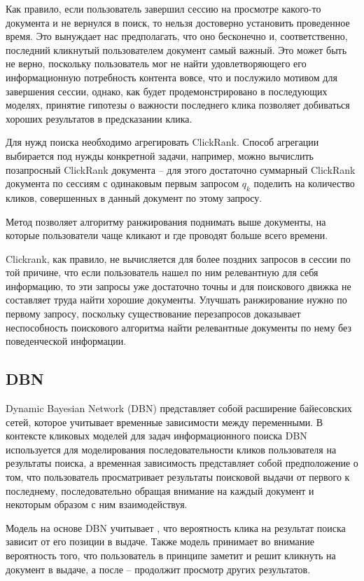 \documentclass[diploma]{nanolab2015}
\begin{document}
Как правило, если пользователь завершил сессию на просмотре какого-то документа и не вернулся в поиск, то нельзя достоверно установить проведенное время. Это вынуждает нас предполагать, что оно бесконечно и, соответственно, последний кликнутый пользователем документ самый важный. Это может быть не верно, поскольку пользователь мог не найти удовлетворяющего его информационную потребность контента вовсе, что и послужило мотивом для завершения сессии, однако, как будет продемонстрировано в последующих моделях, принятие гипотезы о важности последнего клика позволяет добиваться хороших результатов в предсказании клика. 

Для нужд поиска необходимо агрегировать ClickRank. Способ агрегации выбирается под нужды конкретной задачи, например, можно вычислить позапросный ClickRank документа -- для этого достаточно суммарный ClickRank документа по сессиям с одинаковым первым запросом $q_k$ поделить на количество кликов, совершенных в данный документ по этому запросу.

Метод позволяет алгоритму ранжирования поднимать выше документы, на которые пользователи чаще кликают и где проводят больше всего времени.

Clickrank, как правило, не вычисляется для более поздних запросов в сессии по той причине, что если пользователь нашел по ним релевантную для себя информацию, то эти запросы уже достаточно точны и для поискового движка не составляет труда найти хорошие документы. Улучшать ранжирование нужно по первому запросу, поскольку существование перезапросов доказывает неспособность поискового алгоритма найти релевантные документы по нему без поведенческой информации.

\subsection{DBN}
Dynamic Bayesian Network (DBN) представляет собой расширение байесовских сетей, которое учитывает временные зависимости между переменными. В контексте кликовых моделей для задач информационного поиска DBN используется для моделирования последовательности кликов пользователя на результаты поиска, а временная зависимость представляет собой предположение о том, что пользователь просматривает результаты поисковой выдачи от первого к последнему, последовательно обращая внимание на каждый документ и некоторым образом с ним взаимодействуя.

Модель на основе DBN учитывает \cite{DBN}, что вероятность клика на результат поиска зависит от его позиции в выдаче. Также модель принимает во внимание вероятность того, что пользователь в принципе заметит и решит кликнуть на документ в выдаче, а после -- продолжит просмотр других результатов.
\end{document}
